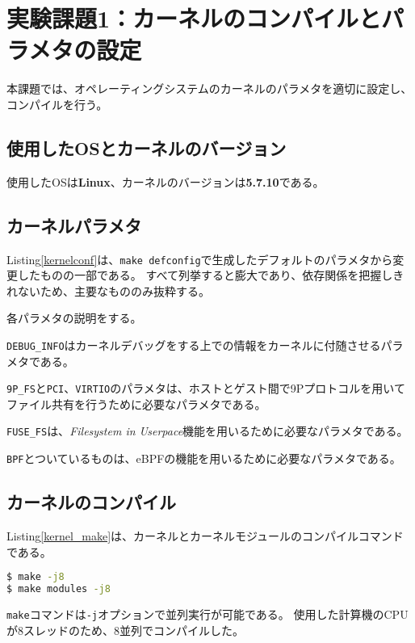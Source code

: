 \documentclass[main]{subfiles}
\begin{document}
\section{実験課題1：カーネルのコンパイルとパラメタの設定}

本課題では、オペレーティングシステムのカーネルのパラメタを適切に設定し、コンパイルを行う。

\subsection{使用したOSとカーネルのバージョン}

使用したOSは\textbf{Linux}、カーネルのバージョンは\textbf{5.7.10}である。

\subsection{カーネルパラメタ}
\label{kernel_param}

Listing\ref{kernelconf}は、\texttt{make defconfig}で生成したデフォルトのパラメタから変更したものの一部である。
すべて列挙すると膨大であり、依存関係を把握しきれないため、主要なもののみ抜粋する。



各パラメタの説明をする。

\texttt{DEBUG\_INFO}はカーネルデバッグをする上での情報をカーネルに付随させるパラメタである。

\texttt{9P\_FS}と\texttt{PCI}、\texttt{VIRTIO}のパラメタは、ホストとゲスト間で9Pプロトコルを用いてファイル共有を行うために必要なパラメタである。

\texttt{FUSE\_FS}は、\textit{Filesystem in Userpace}機能を用いるために必要なパラメタである。

\texttt{BPF}とついているものは、eBPFの機能を用いるために必要なパラメタである。

\subsection{カーネルのコンパイル}

Listing\ref{kernel_make}は、カーネルとカーネルモジュールのコンパイルコマンドである。

\begin{lstlisting}[language=sh,label=kernel_make,caption=カーネルのコンパイル]
$ make -j8
$ make modules -j8
\end{lstlisting}

\texttt{make}コマンドは\texttt{-j}オプションで並列実行が可能である。
使用した計算機のCPUが8スレッドのため、8並列でコンパイルした。
\end{document}
